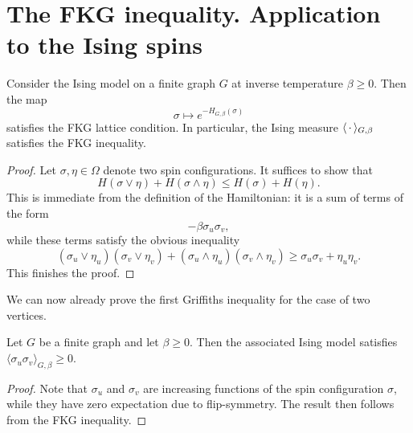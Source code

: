 \section{The FKG inequality. Application to the Ising spins}

\begin{lemma}
    Consider the Ising model on a finite graph $G$ at inverse
    temperature $\beta\geq 0$.
    Then the map
    \[
        \sigma\mapsto e^{-H_{G,\beta}(\sigma)}
    \]
    satisfies the FKG lattice condition.
    In particular, the Ising measure
    $\langle\,\cdot\,\rangle_{G,\beta}$ satisfies the FKG inequality.
\end{lemma}

\begin{proof}
    Let $\sigma,\eta\in\Omega$ denote two spin configurations.
    It suffices to show that
    \[
        H(\sigma\vee\eta)+H(\sigma\wedge\eta)
        \leq
        H(\sigma)+H(\eta).
    \]
    This is immediate from the definition of the Hamiltonian:
    it is a sum of terms of the form
    \[
        -\beta\sigma_u\sigma_v,
    \]
    while these terms satisfy the obvious inequality
    \[
        (\sigma_u\vee \eta_u)(\sigma_v\vee \eta_v)
        +
        (\sigma_u\wedge \eta_u)(\sigma_v\wedge \eta_v)
        \geq
        \sigma_u\sigma_v+\eta_u\eta_v.
    \]
    This finishes the proof.
\end{proof}

We can now already prove the first Griffiths inequality for the case of
two vertices.

\begin{corollary}
    Let $G$ be a finite graph and let $\beta\geq 0$.
    Then the associated Ising model satisfies $\langle\sigma_u\sigma_v\rangle_{G,\beta}\geq 0$.
\end{corollary}

\begin{proof}
    Note that $\sigma_u$ and $\sigma_v$ are increasing functions
    of the spin configuration $\sigma$,
    while they have zero expectation due to flip-symmetry.
    The result then follows from the FKG inequality.
\end{proof}
